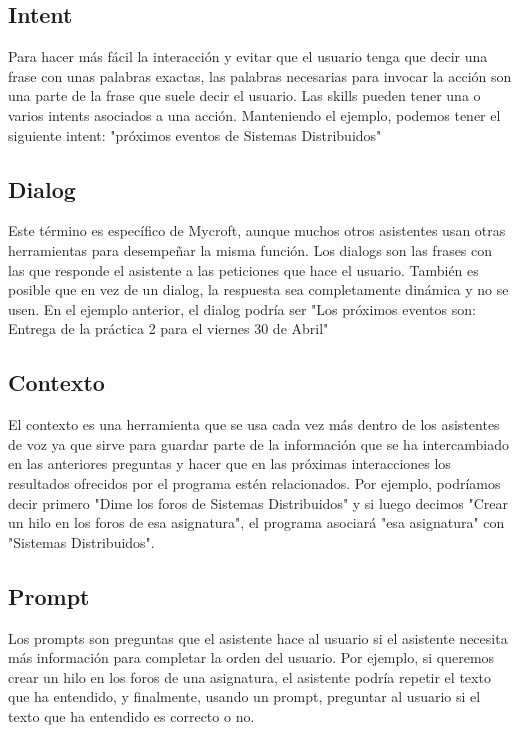 \subsection{Intent}
Para hacer más fácil la interacción y evitar que el usuario tenga que decir una frase con unas palabras exactas, las palabras necesarias para invocar la acción son una parte de la frase que suele decir el usuario. Las skills pueden tener una o varios intents asociados a una acción. Manteniendo el ejemplo, podemos tener el siguiente intent: "próximos eventos de Sistemas Distribuidos"

\subsection{Dialog}
Este término es específico de Mycroft, aunque muchos otros asistentes usan otras herramientas para desempeñar la misma función. Los dialogs son las frases con las que responde el asistente a las peticiones que hace el usuario. También es posible que en vez de un dialog, la respuesta sea completamente dinámica y no se usen. En el ejemplo anterior, el dialog podría ser "Los próximos eventos son: Entrega de la práctica 2 para el viernes 30 de Abril"

\subsection{Contexto}
El contexto es una herramienta que se usa cada vez más dentro de los asistentes de voz ya que sirve para guardar parte de la información que se ha intercambiado en las anteriores preguntas y hacer que en las próximas interacciones los resultados ofrecidos por el programa estén relacionados. Por ejemplo, podríamos decir primero "Dime los foros de Sistemas Distribuidos" y si luego decimos "Crear un hilo en los foros de esa asignatura", el programa asociará "esa asignatura" con "Sistemas Distribuidos".

\subsection{Prompt}
Los prompts son preguntas que el asistente hace al usuario si el asistente necesita más información para completar la orden del usuario. Por ejemplo, si queremos crear un hilo en los foros de una asignatura, el asistente podría repetir el texto que ha entendido, y finalmente, usando un prompt, preguntar al usuario si el texto que ha entendido es correcto o no.